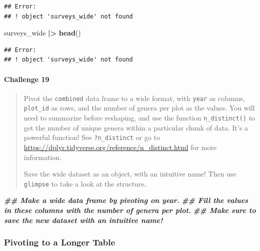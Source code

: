 \documentclass[
  10pt,
  letterpaper,
  twoside,
  openright]{book}
\newenvironment{Shaded}{\begin{snugshade}}{\end{snugshade}}
\newcommand{\DocumentationTok}[1]{\textcolor[rgb]{0.56,0.35,0.01}{\textbf{\textit{#1}}}}
\newcommand{\FunctionTok}[1]{\textcolor[rgb]{0.13,0.29,0.53}{\textbf{#1}}}
\newcommand{\NormalTok}[1]{#1}
\newcommand{\SpecialCharTok}[1]{\textcolor[rgb]{0.81,0.36,0.00}{\textbf{#1}}}
\begin{document}
\begin{verbatim}
## Error:
## ! object 'surveys_wide' not found
\end{verbatim}

\begin{Shaded}
\begin{Highlighting}[]
\NormalTok{surveys\_wide }\SpecialCharTok{|\textgreater{}} 
  \FunctionTok{head}\NormalTok{()}
\end{Highlighting}
\end{Shaded}

\begin{verbatim}
## Error:
## ! object 'surveys_wide' not found
\end{verbatim}

\hypertarget{challenge-19}{%
\paragraph{Challenge 19}\label{challenge-19}}

\begin{quote}
Pivot the \texttt{combined} data frame to a wide format, with
\texttt{year} as columns, \texttt{plot\_id} as rows, and the number of
genera per plot as the values. You will need to summarize before
reshaping, and use the function \texttt{n\_distinct()} to get the number
of unique genera within a particular chunk of data. It's a powerful
function! See \texttt{?n\_distinct} or go to
\url{https://dplyr.tidyverse.org/reference/n_distinct.html} for more
information.

Save the wide dataset as an object, with an intuitive name! Then use
\texttt{glimpse} to take a look at the structure.
\end{quote}

\begin{Shaded}
\begin{Highlighting}[]
\DocumentationTok{\#\# Make a wide data frame by pivoting on year. }
\DocumentationTok{\#\# Fill the values in these columns with the number of genera per plot. }
\DocumentationTok{\#\# Make sure to save the new dataset with an intuitive name!}
\end{Highlighting}
\end{Shaded}

\hypertarget{pivoting-to-a-longer-table}{%
\subsubsection{Pivoting to a Longer
Table}\label{pivoting-to-a-longer-table}}
\end{document}
